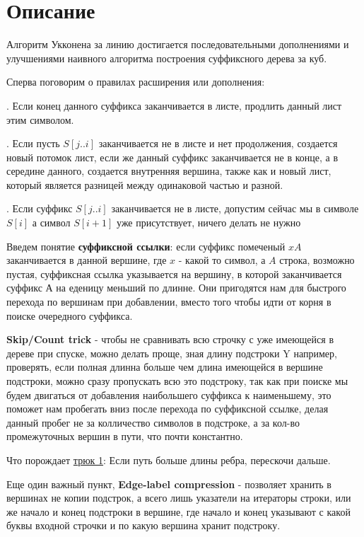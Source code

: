 \section{Описание}

Алгоритм Укконена за линию достигается последовательными дополнениями и улучшениями наивного алгоритма построения суффиксного дерева за куб.

Сперва поговорим о правилах расширения или дополнения:

. Если конец данного суффикса заканчивается в листе, продлить данный лист этим символом.

. Если пусть $S[j..i]$ заканчивается не в листе и нет продолжения, создается новый потомок лист, если же данный суффикс заканчивается не в конце, а в середине данного, создается внутренняя вершина, также как и новый лист, который является разницей между одинаковой частью и разной.

. Если суффикс $S[j..i]$ заканчивается не в листе, допустим сейчас мы в символе $S[i]$ а символ $S[i+1]$ уже присутствует, ничего делать не нужно

Введем понятие \textbf{суффиксной ссылки}: если суффикс помеченый $x A$ заканчивается в данной вершине, где $x$ - какой то символ, а $A$ строка, возможно пустая, суффиксная ссылка указывается на вершину, в которой заканчивается суффикс А на еденицу меньший по длинне. Они пригодятся нам для быстрого перехода по вершинам при добавлении, вместо того чтобы идти от корня в поиске очередного суффикса.

\textbf{Skip/Count trick} - чтобы не сравнивать всю строчку с уже имеющейся в дереве при спуске, можно делать проще, зная длину подстроки Y например, проверять, если полная длинна больше чем длина имеющейся в вершине подстроки, можно сразу пропускать всю это подстроку, так как при поиске мы будем двигаться от добавления наибольшего суффикса к наименьшему, это поможет нам пробегать вниз после перехода по суффиксной ссылке, делая данный пробег не за колличество символов в подстроке, а за кол-во промежуточных вершин в пути, что почти константно.

Что порождает \underline{трюк 1}: Если путь больше длины ребра, перескочи дальше.

Еще один важный пункт, \textbf{Edge-label compression} - позволяет хранить в вершинах не копии подстрок, а всего лишь указатели на итераторы строки, или же начало и конец подстроки в вершине, где начало и конец указывают с какой буквы входной строчки и по какую вершина хранит подстроку.

